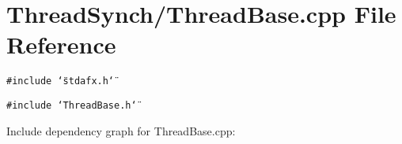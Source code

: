 \section{Thread\-Synch/Thread\-Base.cpp File Reference}
\label{_thread_base_8cpp}
{\tt \#include \char`\"{}stdafx.h\char`\"{}}\par
{\tt \#include \char`\"{}Thread\-Base.h\char`\"{}}\par


Include dependency graph for Thread\-Base.cpp: